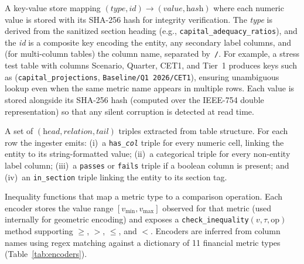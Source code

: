 \documentclass[11pt]{article}
\begin{document}
\begin{description}[leftmargin=1.5em, labelindent=0em]
  \item[Exact Numeric Memory (ENM) $\mathcal{E}$:]  A key-value store
    mapping $(\textit{type}, \textit{id}) \to (\textit{value},
    \textit{hash})$ where each numeric value is stored with its SHA-256
    hash for integrity verification.  The \textit{type} is derived from
    the sanitized section heading (e.g.,
    \texttt{capital\_adequacy\_ratios}), and the \textit{id} is a
    composite key encoding the entity, any secondary label columns, and
    (for multi-column tables) the column name, separated by~\texttt{/}.
    For example, a stress test table with columns Scenario, Quarter,
    CET1, and Tier~1 produces keys such as
    (\texttt{capital\_projections},
    \texttt{Baseline/Q1\,2026/CET1}),
    ensuring unambiguous lookup even when the same metric name appears
    in multiple rows.  Each value is stored alongside its SHA-256 hash
    (computed over the IEEE-754 double representation) so that any
    silent corruption is detected at read time.

  \item[Knowledge Graph Triples $\mathcal{T}$:]  A set of
    $(\textit{head}, \textit{relation}, \textit{tail})$ triples extracted
    from table structure.  For each row the ingester emits:
    (i)~a \texttt{has\_\textit{col}} triple for every numeric cell,
    linking the entity to its string-formatted value;
    (ii)~a categorical triple for every non-entity label column;
    (iii)~a \texttt{passes} or \texttt{fails} triple if a boolean column
    is present; and
    (iv)~an \texttt{in\_section} triple linking the entity to its
    section tag.

  \item[Phase Encoders $\Phi$:]  Inequality functions that map a metric
    type to a comparison operation.  Each encoder stores the value range
    $[v_{\min}, v_{\max}]$ observed for that metric (used internally for
    geometric encoding) and exposes a \texttt{check\_inequality}$(v,
    \tau, \mathrm{op})$ method supporting $\geq$, $>$, $\leq$, and $<$.
    Encoders are inferred from column names using regex matching against a
    dictionary of 11 financial metric types (Table~\ref{tab:encoders}).
\end{description}
\end{document}
